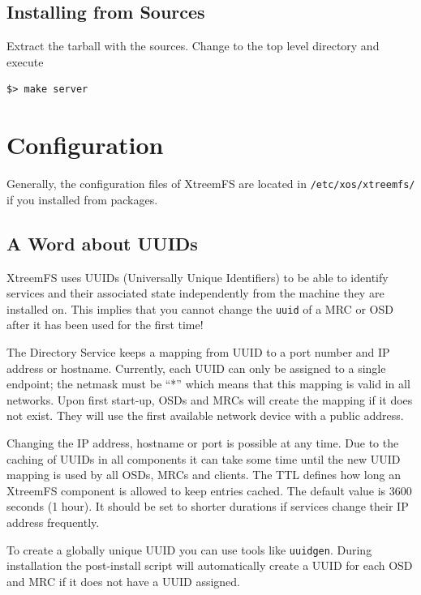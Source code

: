 \documentclass[a4paper,10pt]{book}
\begin{document}
\subsection{Installing from Sources}

Extract the tarball with the sources. Change to the top level directory and execute


\begin{verbatim}
$> make server
\end{verbatim}


\section{Configuration}
\label{sec:service_config}

Generally, the configuration files of XtreemFS are located in \texttt{/etc/xos/xtreemfs/} if you installed from packages.


\subsection{A Word about UUIDs}

XtreemFS uses UUIDs (Universally Unique Identifiers) to be able to identify services and their associated state independently from the machine they are installed on. This implies that you cannot change the \texttt{uuid} of a MRC or OSD after it has been used for the first time!

The Directory Service keeps a mapping from UUID to a port number and IP address or hostname. Currently, each UUID can only be assigned to a single endpoint; the netmask must be ``*'' which means that this mapping is valid in all networks. Upon first start-up, OSDs and MRCs will create the mapping if it does not exist. They will use the first available network device with a public address.

Changing the IP address, hostname or port is possible at any time. Due to the caching of UUIDs in all components it can take some time until the new UUID mapping is used by all OSDs, MRCs and clients. The TTL defines how long an XtreemFS component is allowed to keep entries cached. The default value is 3600 seconds (1 hour). It should be set to shorter durations if services change their IP address frequently.

To create a globally unique UUID you can use tools like \texttt{uuidgen}. During installation the post-install script will automatically create a UUID for each OSD and MRC if it does not have a UUID assigned.
\end{document}
